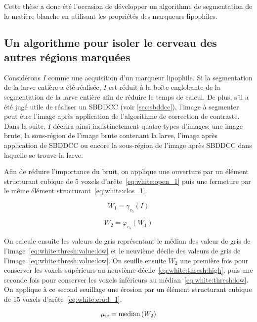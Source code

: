 \documentclass[\main/main.tex]{subfiles}
\begin{document}
%
Cette thèse a donc été l'occasion de développer un algorithme de segmentation de la matière blanche en utilisant les propriétés des marqueurs lipophiles.


\subsection{Un algorithme pour isoler le cerveau des autres régions marquées}

%
Considérons $I$ comme une acquisition d'un marqueur lipophile.
%
Si la segmentation de la larve entière a été réalisée, $I$ est réduit à la boîte englobante de la segmentation de la larve entière afin de réduire le temps de calcul.
%
De plus, s'il a été jugé utile de réaliser un SBDDCC (voir \autoref{sec:sbddcc}), l'image à segmenter peut être l'image après application de l'algorithme de correction de contraste.
%
Dans la suite, $I$ décrira ainsi indistinctement quatre types d'images:
une image brute, la sous-région de l'image brute contenant la larve,
l'image après application de SBDDCC ou encore la sous-région de l'image après SBDDCC dans laquelle se trouve la larve.

%
Afin de réduire l'importance du bruit, on applique une ouverture par un élément structurant cubique de 5 voxels d'arête~\eqref{eq:white:open_1} puis une fermeture par le même élément structurant~\eqref{eq:white:clos_1}.

\begin{equation}
\label{eq:white:open_1}
    W_1 = \gamma_{c_5}(I)
\end{equation}

\begin{equation}
\label{eq:white:clos_1}
    W_2 = \varphi_{c_5}(W_1)
\end{equation}

%
On calcule ensuite les valeurs de gris représentant le médian des valeur de gris de l'image~\eqref{eq:white:thresh:value:low} et le neuvième décile des valeurs de gris de l'image~\eqref{eq:white:thresh:value:low}.
%
On seuille ensuite $W_2$ une première fois pour conserver les voxels supérieurs au neuvième décile~\eqref{eq:white:thresh:high}, puis une seconde fois pour conserver les voxels inférieurs au médian~\eqref{eq:white:thresh:low}.
%
On applique à ce second seuillage une érosion par un élément structurant cubique de 15 voxels d'arête~\eqref{eq:white:erod_1}.

\begin{equation}
\label{eq:white:thresh:value:low}
    \mu_w = \operatorname{\textnormal{median}}{}(W_2)
\end{equation}
\end{document}
